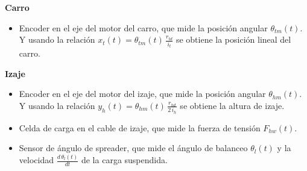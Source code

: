 \documentclass{article}
\begin{document}
\noindent\textbf{Carro}
\begin{itemize}
    \item Encoder en el eje del motor del carro, que mide la posición angular $\theta_{tm}(t)$. Y usando la relación
    $x_t(t) = \theta_{tm}(t) \, \frac{r_{td}}{i_t}$ se obtiene la posición lineal del carro.
\end{itemize} 
\noindent\textbf{Izaje}
\begin{itemize}
    \item Encoder en el eje del motor del izaje, que mide la posición angular $\theta_{hm}(t)$. Y usando la relación
    $y_h(t) = \theta_{hm}(t) \, \frac{r_{hd}}{2\,i_h}$ se obtiene la altura de izaje.
    \item Celda de carga en el cable de izaje, que mide la fuerza de tensión $F_{hw}(t)$.
    \item Sensor de ángulo de spreader, que mide el ángulo de balanceo $\theta_l(t)$ y la velocidad $\frac{d\,\theta_l(t)}{dt}$
    de la carga suspendida.
\end{itemize}
\end{document}
